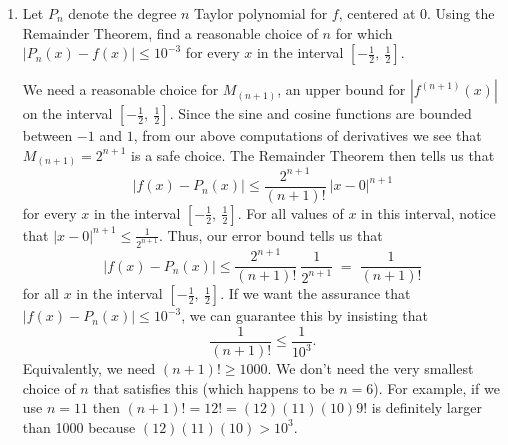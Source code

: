 \documentclass[main]{subfiles}
\begin{document}
\begin{enumerate}
\begin{enumerate}
    \item
    \begin{problem}
      Let $P_n$ denote the degree $n$ Taylor polynomial for $f$, centered at $0$.
      Using the Remainder Theorem,
      find a reasonable choice of $n$ for which $|P_{n}(x) - f(x)| \leq 10^{-3}$ for every $x$
      in the interval $\displaystyle \left[ - \frac{1}{2}, \: \frac{1}{2} \right]$.
     
    \end{problem}  
      
    \begin{solution}
      We need a reasonable choice for $M_{(n+1)}$, an upper bound for
      $|f^{(n+1)}(x)|$ on the interval $[- \frac{1}{2}, \: \frac{1}{2} ]$.  Since
      the sine and cosine functions are bounded between $-1$ and $1$, from our above
      computations of derivatives we see that $M_{(n+1)} = 2^{n+1}$ is a safe choice.
      The Remainder Theorem then tells us that
      $$ 
        |f(x) - P_{n}(x)| \leq \frac{2^{n+1}}{(n+1)!} \: |x - 0|^{n+1}
      $$     
      for every $x$ in the interval $[- \frac{1}{2}, \: \frac{1}{2} ]$.  For all
      values of $x$ in this interval, notice that $\displaystyle |x - 0|^{n+1} \leq \frac{1}{2^{n+1}}$.      
      Thus, our error bound tells us that
      $$ 
        |f(x) - P_{n}(x)| \leq \frac{2^{n+1}}{(n+1)!} \: \frac{1}{2^{n+1}} \; = \; \frac{1}{(n+1)!}
      $$
      for all $x$ in the interval $[- \frac{1}{2}, \: \frac{1}{2}]$.  If we want the assurance
      that $|f(x) - P_{n}(x)| \leq 10^{-3}$, we can guarantee this by insisting that
      $$
        \frac{1}{(n+1)!} \leq \frac{1}{10^3}.  
      $$
      Equivalently, we need $(n+1)! \geq 1000$.  We don't need the very smallest choice of
      $n$ that satisfies this (which happens to be $n = 6$).  For example, if we use $n = 11$
      then $(n+1)! = 12! = (12)(11)(10) 9!$ is definitely larger than 1000 because $(12)(11)(10) > 10^3$.
    \end{solution}  
  \end{enumerate}



 \end{enumerate}
\end{document}
